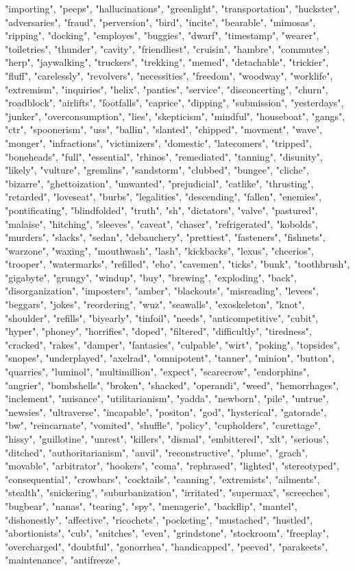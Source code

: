 "importing", "peeps", "hallucinations", "greenlight", "transportation", "huckster", "adversaries", "fraud", "perversion", "bird", "incite", "bearable", "mimosas", "ripping", "docking", "employes", "buggies", "dwarf", "timestamp", "wearer", "toiletries", "thunder", "cavity", "friendliest", "cruisin", "hambre", "commutes", "herp", "jaywalking", "truckers", "trekking", "memed", "detachable", "trickier", "fluff", "carelessly", "revolvers", "necessities", "freedom", "woodway", "worklife", "extremism", "inquiries", "helix", "panties", "service", "disconcerting", "churn", "roadblock", "airlifts", "footfalls", "caprice", "dipping", "submission", "yesterdays", "junker", "overconsumption", "lies", "skepticism", "mindful", "houseboat", "gangs", "ctr", "spoonerism", "uss", "ballin", "slanted", "chipped", "movment", "wave", "monger", "infractions", "victimizers", "domestic", "latecomers", "tripped", "boneheads", "full", "essential", "rhinos", "remediated", "tanning", "disunity", "likely", "vulture", "gremlins", "sandstorm", "clubbed", "bungee", "cliche", "bizarre", "ghettoization", "unwanted", "prejudicial", "catlike", "thrusting", "retarded", "loveseat", "burbs", "legalities", "descending", "fallen", "enemies", "pontificating", "blindfolded", "truth", "sh", "dictators", "valve", "pastured", "malaise", "hitching", "sleeves", "caveat", "chaser", "refrigerated", "kobolds", "murders", "slacks", "sedan", "debauchery", "prettiest", "fasteners", "fishnets", "warzone", "waxing", "mouthwash", "lash", "kickbacks", "lexus", "cheerios", "trooper", "watermarks", "refilled", "eho", "cavemen", "ticks", "bunk", "toothbrush", "gigabyte", "grungy", "windup", "buy", "brewing", "exploding", "back", "disorganization", "imposters", "amber", "blackouts", "misreading", "levees", "beggars", "jokes", "reordering", "wuz", "seawalls", "exoskeleton", "knot", "shoulder", "refills", "biyearly", "tinfoil", "needs", "anticompetitive", "cubit", "hyper", "phoney", "horrifies", "doped", "filtered", "difficultly", "tiredness", "cracked", "rakes", "damper", "fantasies", "culpable", "wirt", "poking", "topsides", "snopes", "underplayed", "axelrad", "omnipotent", "tanner", "minion", "button", "quarries", "luminol", "multimillion", "expect", "scarecrow", "endorphins", "angrier", "bombshells", "broken", "shacked", "operandi", "weed", "hemorrhages", "inclement", "nuisance", "utilitarianism", "yadda", "newborn", "pile", "untrue", "newsies", "ultraverse", "incapable", "positon", "god", "hysterical", "gatorade", "bw", "reincarnate", "vomited", "shuffle", "policy", "cupholders", "curettage", "hissy", "guillotine", "unrest", "killers", "dismal", "embittered", "xlt", "serious", "ditched", "authoritarianism", "anvil", "reconstructive", "plume", "grach", "movable", "arbitrator", "hookers", "coma", "rephrased", "lighted", "stereotyped", "consequential", "crowbars", "cocktails", "canning", "extremists", "ailments", "stealth", "snickering", "suburbanization", "irritated", "supermax", "screeches", "bugbear", "nanas", "tearing", "spy", "menagerie", "backflip", "mantel", "dishonestly", "affective", "ricochets", "pocketing", "mustached", "hustled", "abortionists", "cub", "snitches", "even", "grindstone", "stockroom", "freeplay", "overcharged", "doubtful", "gonorrhea", "handicapped", "peeved", "parakeets", "maintenance", "antifreeze", 